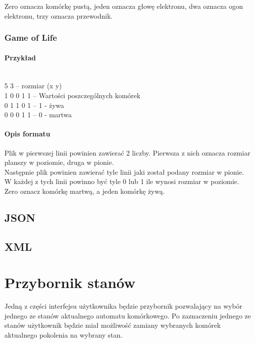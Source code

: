\documentclass{report}
\begin{document}
Zero oznacza komórkę pustą, jeden oznacza głowę elektronu, dwa oznacza ogon elektronu, trzy oznacza przewodnik.

\subsubsection{Game of Life}

\paragraph{Przykład} \mbox{} \\
5 3 \tab -- rozmiar (x y) \\
1 0 0 1 1 \tab -- Wartości poszczególnych komórek \\
0 1 1 0 1 \tab -- 1 - żywa \\
0 0 0 1 1 \tab -- 0 - martwa \\

\paragraph{Opis formatu}
Plik w pierwszej linii powinien zawierać 2 liczby. Pierwsza z nich oznacza rozmiar planszy w poziomie, druga w pionie. \\
Następnie plik powinien zawierać tyle linii jaki został podany rozmiar w pionie. W każdej z tych linii powinno być tyle 0 lub 1 ile wynosi rozmiar w poziomie. \\
Zero oznacz komórkę martwą, a jeden komórkę żywą.

\subsection{JSON}

\subsection{XML}

\section{Przybornik stanów}
Jedną z części interfejsu użytkownika będzie przybornik pozwalający na wybór jednego ze stanów aktualnego automatu komórkowego. Po zaznaczeniu jednego ze stanów użytkownik będzie miał możliwość zamiany wybranych komórek aktualnego pokolenia na wybrany stan.
\end{document}
